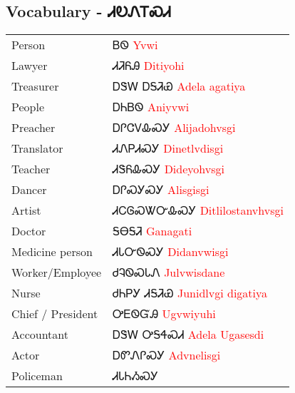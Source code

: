 \begin{multicols}
\newpage\subsection{Vocabulary - ᏗᎧᏁᎢᏍᏗ 
}
\begin{minipage}{\linewidth}
\begin{tabular}{p{5cm} p{9cm}}
Person & ᏴᏫ 
 \newline \textcolor{red}{Yvwi}\\
Lawyer & ᏗᏘᏲᎯ 
 \newline \textcolor{red}{Ditiyohi}\\
Treasurer & ᎠᏕᎳ ᎠᎦᏘᏯ 
 \newline \textcolor{red}{Adela agatiya}\\
People & ᎠᏂᏴᏫ 
 \newline \textcolor{red}{Aniyvwi}\\
Preacher & ᎠᎵᏣᏙᎲᏍᎩ 
 \newline \textcolor{red}{Alijadohvsgi}\\
Translator & ᏗᏁᏢᏗᏍᎩ 
 \newline \textcolor{red}{Dinetlvdisgi}\\
Teacher & ᏗᏕᏲᎲᏍᎩ 
 \newline \textcolor{red}{Dideyohvsgi}\\
Dancer & ᎠᎵᏍᎩᏍᎩ 
 \newline \textcolor{red}{Alisgisgi}\\
Artist & ᏗᏟᎶᏍᏔᏅᎲᏍᎩ 
 \newline \textcolor{red}{Ditlilostanvhvsgi}\\
Doctor & ᎦᎾᎦᏘ 
 \newline \textcolor{red}{Ganagati}\\
Medicine person & ᏗᏓᏅᏫᏍᎩ 
 \newline \textcolor{red}{Didanvwisgi}\\
Worker/Employee & ᏧᎸᏫᏍᏓᏁ 
 \newline \textcolor{red}{Julvwisdane}\\
Nurse & ᏧᏂᏢᎩ ᏗᎦᏘᏯ 
 \newline \textcolor{red}{Junidlvgi digatiya}\\
Chief / President & ᎤᎬᏫᏳᎯ 
 \newline \textcolor{red}{Ugvwiyuhi}\\
Accountant & ᎠᏕᎳ ᎤᎦᏎᏍᏗ 
 \newline \textcolor{red}{Adela Ugasesdi}\\
Actor & ᎠᏛᏁᎵᏍᎩ 
 \newline \textcolor{red}{Advnelisgi}\\
Policeman & ᏗᏓᏂᏱᏍᎩ 

\end{tabular}
\end{minipage}
\end{multicols}
